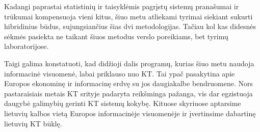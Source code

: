 \begin{multicols}{2}
Kadangi paprastai statistinių ir taisyklėmis pagrįstų sistemų pranašumai ir trūkumai kompensuoja vieni kitus, šiuo metu atliekami tyrimai siekiant sukurti hibridinius būdus, sujungsiančius šias dvi metodologijas. Tačiau kol kas didesnės sėkmės pasiekta ne taikant šiuos metodus verslo poreikiams, bet tyrimų laboratorijose. 

Taigi galima konstatuoti, kad didžioji dalis programų, kurias šiuo metu naudoja informacinė visuomenė, labai priklauso nuo KT. Tai ypač pasakytina apie Europos ekonominę ir informacinę erdvę su jos daugiakalbe bendruomene. Nors pastaraisiais metais KT srityje padaryta reikšminga pažanga, vis dar egzistuoja daugybė galimybių gerinti KT sistemų kokybę. Kituose skyriuose aptarsime lietuvių kalbos vietą Europos informacinėje visuomenėje ir įvertinsime dabartinę lietuvių KT būklę.
\end{multicols}

\clearpage



